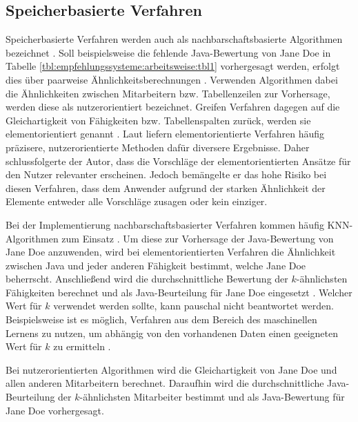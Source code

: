 \subsection{Speicherbasierte Verfahren}
\label{ch:empfehlungssysteme:cf:speicherbasiert}
Speicherbasierte Verfahren werden auch als nachbarschaftsbasierte Algorithmen bezeichnet \cite[S. 29]{recommenderSystems:2016}. Soll beispielsweise die fehlende Java-Bewertung von Jane Doe in Tabelle \ref{tbl:empfehlungssysteme:arbeitsweise:tbl1} vorhergesagt werden, erfolgt dies über paarweise Ähnlichkeitsberechnungen \cite[S. 2f.]{bharti:2019}. Verwenden Algorithmen dabei die Ähnlichkeiten zwischen Mitarbeitern bzw. Tabellenzeilen zur Vorhersage, werden diese als nutzerorientiert bezeichnet. Greifen Verfahren dagegen auf die Gleichartigkeit von Fähigkeiten bzw. Tabellenspalten zurück, werden sie elementorientiert genannt \cite[S. 1f.]{duong:2018}. Laut \textcite[S. 42]{recommenderSystems:2016} liefern elementorientierte Verfahren häufig präzisere, nutzerorientierte Methoden dafür diversere Ergebnisse. Daher schlussfolgerte der Autor, dass die Vorschläge der elementorientierten Ansätze für den Nutzer relevanter erscheinen. Jedoch bemängelte er das hohe Risiko bei diesen Verfahren, dass dem Anwender aufgrund der starken Ähnlichkeit der Elemente entweder alle Vorschläge zusagen oder kein einziger.

Bei der Implementierung nachbarschaftsbasierter Verfahren kommen häufig \ac{KNN}-Algorithmen zum Einsatz \cite[S. 1f.]{nayak:2018}. Um diese zur Vorhersage der Java-Bewertung von Jane Doe anzuwenden, wird bei elementorientierten Verfahren die Ähnlichkeit zwischen Java und jeder anderen Fähigkeit bestimmt, welche Jane Doe beherrscht. Anschließend wird die durchschnittliche Bewertung der $k$-ähnlichsten Fähigkeiten berechnet und als Java-Beurteilung für Jane Doe eingesetzt \cite[S. 2]{hao:2013}. Welcher Wert für $k$ verwendet werden sollte, kann pauschal nicht beantwortet werden. Beispielsweise ist es möglich, Verfahren aus dem Bereich des maschinellen Lernens zu nutzen, um abhängig von den vorhandenen Daten einen geeigneten Wert für $k$ zu ermitteln \cite[S. 2f.]{jiang:2007}.

Bei nutzerorientierten Algorithmen wird die Gleichartigkeit von Jane Doe und allen anderen Mitarbeitern berechnet. Daraufhin wird die durchschnittliche Java-Beurteilung der $k$-ähnlichsten Mitarbeiter bestimmt und als Java-Bewertung für Jane Doe vorhergesagt. \cite[S. 2f.]{hao:2013}

